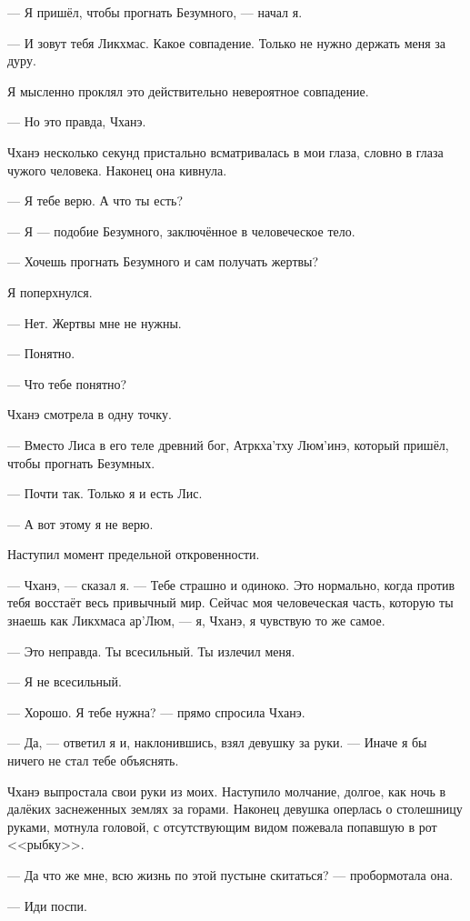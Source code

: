 --- Я пришёл, чтобы прогнать Безумного, --- начал я.

--- И зовут тебя Ликхмас.
Какое совпадение.
Только не нужно держать меня за дуру.

Я мысленно проклял это действительно невероятное совпадение.

--- Но это правда, Чханэ.

Чханэ несколько секунд пристально всматривалась в мои глаза, словно в глаза чужого человека.
Наконец она кивнула.

--- Я тебе верю.
А что ты есть?

--- Я --- подобие Безумного, заключённое в человеческое тело.

--- Хочешь прогнать Безумного и сам получать жертвы?

Я поперхнулся.

--- Нет.
Жертвы мне не нужны.

--- Понятно.

--- Что тебе понятно?

Чханэ смотрела в одну точку.

--- Вместо Лиса в его теле древний бог, Атркха'тху Люм'инэ, который пришёл, чтобы прогнать Безумных.

--- Почти так.
Только я и есть Лис.

--- А вот этому я не верю.

Наступил момент предельной откровенности.

--- Чханэ, --- сказал я.
--- Тебе страшно и одиноко.
Это нормально, когда против тебя восстаёт весь привычный мир.
Сейчас моя человеческая часть, которую ты знаешь как Ликхмаса ар’Люм, --- я, Чханэ, я чувствую то же самое.

--- Это неправда.
Ты всесильный.
Ты излечил меня.

--- Я не всесильный.

--- Хорошо.
Я тебе нужна? --- прямо спросила Чханэ.

--- Да, --- ответил я и, наклонившись, взял девушку за руки.
--- Иначе я бы ничего не стал тебе объяснять.

Чханэ выпростала свои руки из моих.
Наступило молчание, долгое, как ночь в далёких заснеженных землях за горами.
Наконец девушка оперлась о столешницу руками, мотнула головой, с отсутствующим видом пожевала попавшую в рот <<рыбку>>.

--- Да что же мне, всю жизнь по этой пустыне скитаться? --- пробормотала она.

--- Иди поспи.

